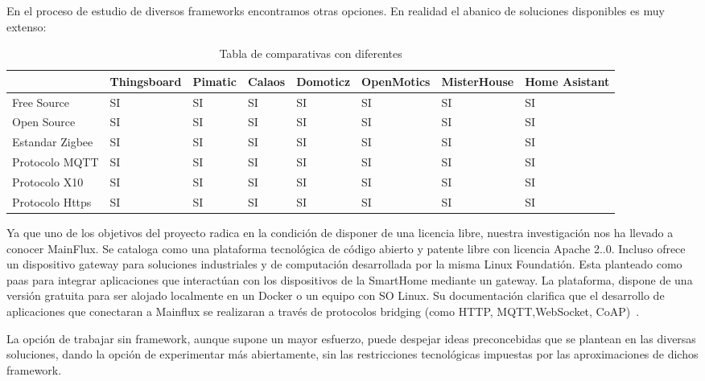 \vspace{1cm}

En el proceso de estudio de diversos frameworks encontramos otras opciones. En realidad el abanico de soluciones disponibles es muy extenso:

\begin{table}[hbtp]
    \begin{center}

    \begin{tabular}{|l|l|l|l|l|l|l|l|}
        \hline
        & Thingsboard & Pimatic & Calaos & Domoticz & OpenMotics  & MisterHouse & Home Asistant \\
        \hline \hline
        Free Source & SI & SI & SI & SI & SI & SI & SI\\ \hline
        Open Source & SI & SI & SI & SI & SI & SI & SI\\ \hline
        Estandar Zigbee & SI & SI & SI & SI & SI & SI & SI\\ \hline
        Protocolo MQTT & SI & SI & SI & SI & SI & SI & SI\\ \hline
        Protocolo X10 & SI & SI & SI & SI & SI & SI & SI\\ \hline
        Protocolo Https & SI & SI & SI & SI & SI & SI & SI\\ \hline
        \hline
    \end{tabular}
    \caption{Tabla de comparativas con diferentes }
    \label{table1}
   \end{center}
\end{table}


Ya que uno de los objetivos del proyecto radica en la condición de disponer de una licencia libre, nuestra investigación nos ha llevado a conocer MainFlux. Se cataloga como una plataforma tecnológica de código abierto y patente libre con licencia Apache 2..0. Incluso ofrece un dispositivo gateway para soluciones industriales y de computación desarrollada por la misma Linux Foundatión. Esta planteado como \gls{paas} para integrar aplicaciones que interactúan con los dispositivos de la SmartHome mediante un gateway. La plataforma, dispone de una versión gratuita para ser alojado localmente en un Docker o un equipo con SO Linux. Su documentación clarifica que el desarrollo de aplicaciones que conectaran a Mainflux se realizaran a través de protocolos bridging (como HTTP, MQTT,WebSocket, CoAP)~\cite{mainfluxdoc}.


La opción de trabajar sin \gls{framework}, aunque supone un mayor esfuerzo, puede despejar ideas preconcebidas que se plantean en las diversas soluciones, dando la opción de experimentar más abiertamente, sin las restricciones tecnológicas impuestas por las aproximaciones de dichos \gls{framework}.

